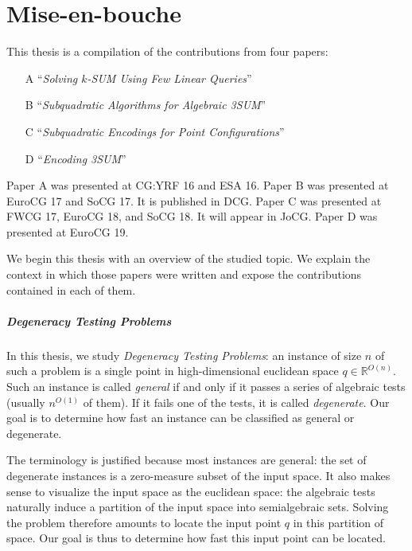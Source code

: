 \chapter{Mise-en-bouche}




This thesis is a compilation of the contributions from four papers:
%
\begin{enumerate}
	\item[A] ``\emph{Solving \(k\)-SUM Using Few Linear Queries}''~\cite{CIO16}
	\item[B] ``\emph{Subquadratic Algorithms for Algebraic 3SUM}''~\cite{BCILOS19}
	\item[C] ``\emph{Subquadratic Encodings for Point Configurations}''~\cite{CCILO19}
	\item[D] ``\emph{Encoding 3SUM}''~\cite{CCILMO19}
\end{enumerate}
%
Paper A was presented at CG:YRF 16 and ESA 16.
%
Paper B was presented at EuroCG 17 and SoCG 17. It is published in DCG.
%
Paper C was presented at FWCG 17, EuroCG 18, and SoCG 18. It will appear in JoCG.
%
Paper D was presented at EuroCG 19.

We begin this thesis with an overview of the studied topic.
%
We explain the context in which those papers were written and expose
the contributions contained in each of them.

\paragraph{Degeneracy Testing Problems}
%
In this thesis,
we study \emph{Degeneracy Testing Problems}:
an instance of size \(n\) of such a problem is a single point in
high-dimensional euclidean space \(q \in \mathbb{R}^{O(n)}\). Such an instance
is called \emph{general} if and only if it passes a series of algebraic tests
(usually \(n^{O(1)}\) of them). If it fails one of the tests, it is
called \emph{degenerate}.
%
Our goal is to determine how fast an instance can be classified as general or
degenerate.

The terminology is justified because most instances
are general: the set of degenerate instances is a zero-measure subset of the
input space. It also makes sense to visualize the input space as the euclidean
space: the algebraic tests naturally induce a partition of
the input space into semialgebraic sets. Solving the problem therefore amounts
to locate the input point \(q\) in this partition of space. Our goal
is thus to determine how fast this input point can be located.

